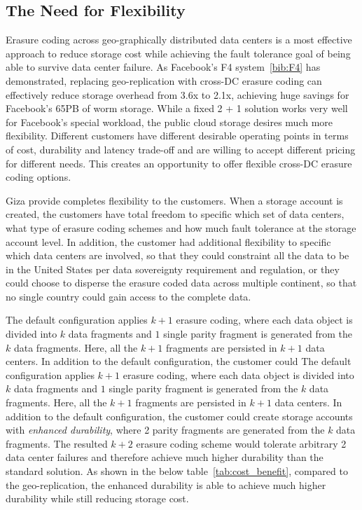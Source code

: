 \subsection{The Need for Flexibility}

Erasure coding across geo-graphically distributed data centers is a most effective approach to reduce storage cost while achieving the fault tolerance goal of being able to survive data center failure. As Facebook's F4 system~\ref{bib:F4} has demonstrated, replacing geo-replication with cross-DC erasure coding can effectively reduce storage overhead from 3.6x to 2.1x, achieving huge savings for Facebook's 65PB of worm storage. While a fixed 2 + 1 solution works very well for Facebook's special workload, the public cloud storage desires much more flexibility. Different customers have different desirable operating points in terms of cost, durability and latency trade-off and are willing to accept different pricing for different needs. This creates an opportunity to offer flexible cross-DC erasure coding options.

Giza provide completes flexibility to the customers. When a storage account is created, the customers have total freedom to specific which set of data centers, what type of erasure coding schemes and how much fault tolerance at the storage account level. In addition, the customer had additional flexibility to specific which data centers are involved, so that they could constraint all the data to be in the United States per data sovereignty requirement and regulation, or they could choose to disperse the erasure coded data across multiple continent, so that no single country could gain access to the complete data.

The default configuration applies $k+1$ erasure coding, where each data object is divided into $k$ data fragments and $1$ single parity fragment is generated from the $k$ data fragments. Here, all the $k+1$ fragments are persisted in $k+1$ data centers. In addition to the default configuration, the customer could 
The default configuration applies $k+1$ erasure coding, where each data object is divided into $k$ data fragments and $1$ single parity fragment is generated from the $k$ data fragments. Here, all the $k+1$ fragments are persisted in $k+1$ data centers. In addition to the default configuration, the customer could create storage accounts with {\em enhanced durability}, where 2 parity fragments are generated from the $k$ data fragments. The resulted $k+2$ erasure coding scheme would tolerate arbitrary 2 data center failures and therefore achieve much higher durability than the standard solution. As shown in the below table~\ref{tab:cost_benefit}, compared to the geo-replication, the enhanced durability is able to achieve much higher durability while still reducing storage cost.

